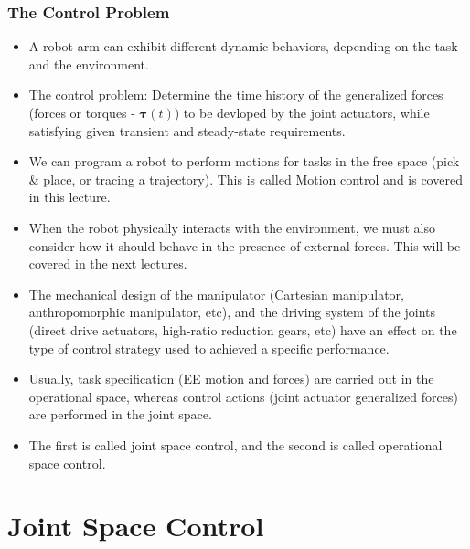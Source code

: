 \documentclass[10pt, aspectratio=169]{beamer}
\theoremstyle{remark}
\theoremstyle{definition}
\begin{document}
\begin{frame}[allowframebreaks]
\frametitle{The Control Problem}
    \begin{itemize}
        \item A robot arm can exhibit different \textcolor{uma_blue_light}{dynamic behaviors}, depending on the task and the environment. 
        \item \textcolor{uma_blue_light}{The control problem:} Determine the time history of the generalized forces (forces or torques - $\boldsymbol{\tau}(t)$) to be devloped by the joint actuators, while satisfying given transient and steady-state requirements. 
        \item We can program a robot to perform \textcolor{uma_blue_light}{motions} for tasks in the \textcolor{uma_blue_light}{free space} (pick \& place, or tracing a trajectory). This is called \textcolor{uma_blue_light}{Motion control} and is covered in this lecture.
        \item When the robot physically interacts with the environment, we must also consider how it should behave in the presence of external forces. This will be covered in the next lectures.
    \end{itemize}

    \framebreak

    \begin{itemize}
        \item The \textcolor{uma_blue_light}{mechanical design} of the manipulator (Cartesian manipulator, anthropomorphic manipulator, etc), and the \textcolor{uma_blue_light}{driving system} of the joints (direct drive actuators, high-ratio reduction gears, etc) have an effect on the type of control strategy used to achieved a specific performance.
        \item Usually, task specification (EE motion and forces) are carried out in the operational space, whereas control actions (joint actuator generalized forces) are performed in the joint space. 
        \item The first is called \textcolor{uma_blue_light}{joint space control}, and the second is called \textcolor{uma_blue_light}{operational space control}.
    \end{itemize}

    
\end{frame}


\section{Joint Space Control}
\end{document}
